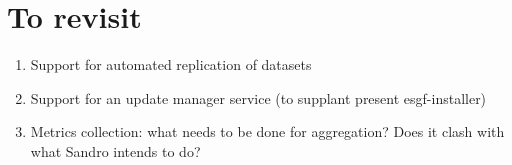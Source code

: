 \documentclass[oneside,12pt]{memoir}
\begin{document}
\section{To revisit}
\begin{enumerate}
\item Support for automated replication of datasets
\item Support for an update manager service (to supplant present esgf-installer)
\item Metrics collection: what needs to be done for aggregation? Does it clash with what Sandro intends to do?
\end{enumerate}
\printbibliography
\hypertarget{mymarker}{}
\printindex
\end{document}
